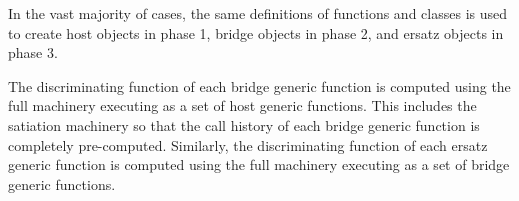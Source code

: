 In the vast majority of cases, the same definitions of functions and
classes is used to create host objects in phase 1, bridge objects in
phase 2, and ersatz objects in phase 3. 

The discriminating function of each bridge generic function is
computed using the full machinery executing as a set of host generic
functions.  This includes the satiation machinery so that the call
history of each bridge generic function is completely pre-computed.
Similarly, the discriminating function of each ersatz generic function
is computed using the full machinery executing as a set of bridge
generic functions.  

